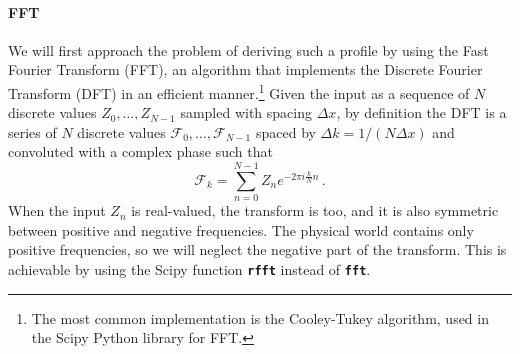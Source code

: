 \paragraph{FFT}
We will first approach the problem of deriving such a profile by using the Fast Fourier Transform (FFT), an algorithm that implements the Discrete Fourier Transform (DFT) in an efficient manner.\footnote{The most common implementation is the Cooley-Tukey algorithm, used in the Scipy Python library for FFT.} Given the input as a sequence of $N$ discrete values $Z_0,\dots,Z_{N-1}$ sampled with spacing $\Delta x$, by definition the DFT is a series of $N$ discrete values $\mathcal{F}_0,\dots,\mathcal{F}_{N-1}$ spaced by $\Delta k = 1/(N\Delta x)$ and convoluted with a complex phase such that
\begin{equation*}
    \mathcal{F}_k = \sum_{n=0}^{N-1} Z_n e^{-2\pi i \frac{k}{N}n}\, .
\end{equation*}
When the input $Z_n$ is real-valued, the transform is too, and it is also symmetric between positive and negative frequencies. The physical world contains only positive frequencies, so we will neglect the negative part of the transform. This is achievable by using the Scipy function \texttt{\textbf{rfft}} instead of \texttt{\textbf{fft}}.

